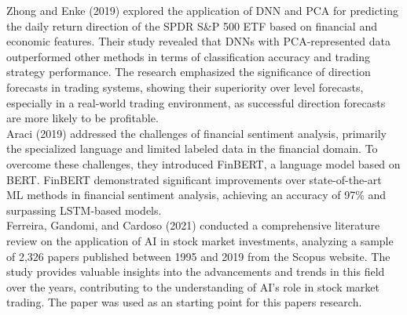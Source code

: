 Zhong and Enke (2019) explored the application of \ac{DNN} and \ac{PCA} for predicting the daily return direction of the SPDR S\&P 500 \ac{ETF} based on financial and economic features. Their study revealed that \ac{DNN}s with \ac{PCA}-represented data outperformed other methods in terms of classification accuracy and trading strategy performance. The research emphasized the significance of direction forecasts in trading systems, showing their superiority over level forecasts, especially in a real-world trading environment, as successful direction forecasts are more likely to be profitable.\cite{zhong2019predicting}\\

Araci (2019) addressed the challenges of financial sentiment analysis, primarily the specialized language and limited labeled data in the financial domain. To overcome these challenges, they introduced \ac{FinBERT}, a language model based on BERT. \ac{FinBERT} demonstrated significant improvements over state-of-the-art \ac{ML} methods in financial sentiment analysis, achieving an accuracy of 97\% and surpassing \ac{LSTM}-based models.\cite{araci2019finbert}\\

Ferreira, Gandomi, and Cardoso (2021) conducted a comprehensive literature review on the application of \ac{AI} in stock market investments, analyzing a sample of 2,326 papers published between 1995 and 2019 from the Scopus website. The study provides valuable insights into the advancements and trends in this field over the years, contributing to the understanding of \ac{AI}'s role in stock market trading. The paper was used as an starting point for this papers research.\cite{ferreira2021artificial}\\

